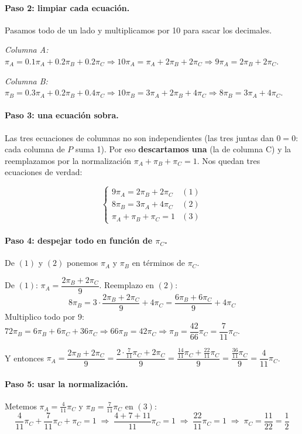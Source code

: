 \documentclass[a4paper,11pt]{article}
\begin{document}
\paragraph{Paso 2: limpiar cada ecuación.} Pasamos todo de un lado y multiplicamos por 10 para sacar los decimales.

\emph{Columna A:} $\pi_A = 0.1\pi_A + 0.2\pi_B + 0.2\pi_C \Rightarrow 10\pi_A = \pi_A + 2\pi_B + 2\pi_C \Rightarrow 9\pi_A = 2\pi_B + 2\pi_C$.

\emph{Columna B:} $\pi_B = 0.3\pi_A + 0.2\pi_B + 0.4\pi_C \Rightarrow 10\pi_B = 3\pi_A + 2\pi_B + 4\pi_C \Rightarrow 8\pi_B = 3\pi_A + 4\pi_C$.

\paragraph{Paso 3: una ecuación sobra.} Las tres ecuaciones de columnas no son independientes (las tres juntas dan $0=0$: cada columna de $P$ suma 1). Por eso \textbf{descartamos una} (la de columna C) y la reemplazamos por la normalización $\pi_A + \pi_B + \pi_C = 1$. Nos quedan tres ecuaciones de verdad:

\[
\begin{cases}
9\pi_A = 2\pi_B + 2\pi_C & (1) \\
8\pi_B = 3\pi_A + 4\pi_C & (2) \\
\pi_A + \pi_B + \pi_C = 1 & (3)
\end{cases}
\]

\paragraph{Paso 4: despejar todo en función de $\pi_C$.} De $(1)$ y $(2)$ ponemos $\pi_A$ y $\pi_B$ en términos de $\pi_C$.

De $(1)$: $\pi_A = \dfrac{2\pi_B + 2\pi_C}{9}$. Reemplazo en $(2)$:
\[
8\pi_B = 3 \cdot \frac{2\pi_B + 2\pi_C}{9} + 4\pi_C = \frac{6\pi_B + 6\pi_C}{9} + 4\pi_C
\]
Multiplico todo por 9: $72\pi_B = 6\pi_B + 6\pi_C + 36\pi_C \Rightarrow 66\pi_B = 42\pi_C \Rightarrow \pi_B = \dfrac{42}{66}\pi_C = \dfrac{7}{11}\pi_C$.

Y entonces $\pi_A = \dfrac{2\pi_B + 2\pi_C}{9} = \dfrac{2 \cdot \frac{7}{11}\pi_C + 2\pi_C}{9} = \dfrac{\frac{14}{11}\pi_C + \frac{22}{11}\pi_C}{9} = \dfrac{\frac{36}{11}\pi_C}{9} = \dfrac{4}{11}\pi_C$.

\paragraph{Paso 5: usar la normalización.} Metemos $\pi_A = \frac{4}{11}\pi_C$ y $\pi_B = \frac{7}{11}\pi_C$ en $(3)$:
\[
\frac{4}{11}\pi_C + \frac{7}{11}\pi_C + \pi_C = 1 \;\Rightarrow\; \frac{4 + 7 + 11}{11}\pi_C = 1 \;\Rightarrow\; \frac{22}{11}\pi_C = 1 \;\Rightarrow\; \pi_C = \frac{11}{22} = \frac{1}{2}
\]
\end{document}
